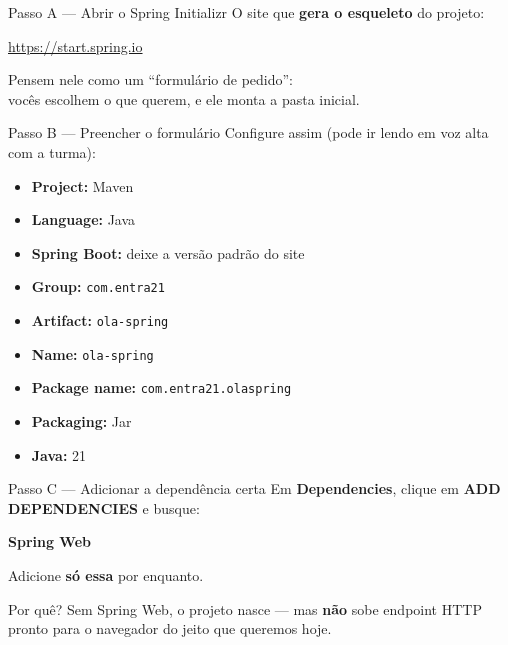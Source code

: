 \documentclass[aspectratio=169,11pt]{beamer}
\begin{document}
\begin{frame}{Passo A --- Abrir o Spring Initializr}
  O site que \textbf{gera o esqueleto} do projeto:

  \vspace{0.4em}
  \begin{center}
    \Large \url{https://start.spring.io}
  \end{center}

  \vspace{0.8em}
  Pensem nele como um “formulário de pedido”:\\
  vocês escolhem o que querem, e ele monta a pasta inicial.
\end{frame}

\begin{frame}{Passo B --- Preencher o formulário}
  Configure assim (pode ir lendo em voz alta com a turma):

  \vspace{0.4em}
  \begin{itemize}
    \item \textbf{Project:} Maven
    \item \textbf{Language:} Java
    \item \textbf{Spring Boot:} deixe a versão padrão do site
    \item \textbf{Group:} \texttt{com.entra21}
    \item \textbf{Artifact:} \texttt{ola-spring}
    \item \textbf{Name:} \texttt{ola-spring}
    \item \textbf{Package name:} \texttt{com.entra21.olaspring}
    \item \textbf{Packaging:} Jar
    \item \textbf{Java:} 21
  \end{itemize}
\end{frame}

\begin{frame}{Passo C --- Adicionar a dependência certa}
  Em \textbf{Dependencies}, clique em \textbf{ADD DEPENDENCIES} e busque:

  \vspace{0.5em}
  \begin{center}
    \Large \textbf{Spring Web}
  \end{center}

  \vspace{0.5em}
  Adicione \textbf{só essa} por enquanto.

  \vspace{0.6em}
  \begin{alertblock}{Por quê?}
    Sem Spring Web, o projeto nasce --- mas \textbf{não} sobe endpoint HTTP
    pronto para o navegador do jeito que queremos hoje.
  \end{alertblock}
\end{frame}
\end{document}
